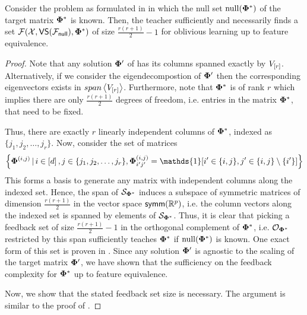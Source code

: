 \begin{lemma}\label{lem: orthoset}
    Consider the problem as formulated in  in which the null set $\mathrm{null}({\boldsymbol{\Phi}^*})$ of the target matrix $\boldsymbol{\Phi}^*$ is known. Then, the teacher sufficiently and necessarily finds a set ${\mathcal{F}}({\mathcal{X}},\textsf{VS}({\mathcal{F}}_{\textsf{null}}),\boldsymbol{\Phi}^*)$ of size $\frac{r(r+1)}{2} - 1$ for oblivious learning up to feature equivalence.
\end{lemma}
\begin{proof}

    Note that any solution $\boldsymbol{\Phi}'$ of  has its columns spanned exactly by $V_{\left[r\right]}$. Alternatively, if we consider the eigendecompostion of $\boldsymbol{\Phi}'$ then the corresponding eigenvectors exists in $span \left<V_{\left[r\right]}\right>$. Furthermore, note that $\boldsymbol{\Phi}^*$ is of rank $r$ which implies there are only $\frac{r(r+1)}{2}$ degrees of freedom, i.e. entries in the matrix $\boldsymbol{\Phi}^*$, that need to be fixed.

    Thus, there are exactly $r$ linearly independent columns of $\boldsymbol{\Phi}^*$, indexed as $\{j_1,j_2,\ldots, j_r\}$. Now, consider the set of matrices
    \begin{align*}
        \curlybracket{\pphi^{(i,j)}\,|\, i \in \bracket{d}, j \in \{j_1,j_2,\ldots, j_r\}, \pphi^{(i,j)}_{i'j'} = \mathds{1}[i'\in \{i,j\}, j' \in \{i,j\}\setminus \{i'\}]}
    \end{align*}
    This forms a basis to generate any matrix with independent columns along the indexed set. Hence, the span of $\mathcal{S}_{\boldsymbol{\Phi}^*}$ induces a subspace of symmetric matrices of dimension $\frac{r(r+1)}{2}$ in the vector space $\textsf{symm}(\mathbb{R}^p)$, i.e. the column vectors along the indexed set is spanned by elements of $\mathcal{S}_{\boldsymbol{\Phi}^*}$. Thus, it is clear that picking a feedback set of size $\frac{r(r+1)}{2} -1$ in the orthogonal complement of $\boldsymbol{\Phi}^*$, i.e. $\mathcal{O}_{\boldsymbol{\Phi}^*}$ restricted by this span sufficiently teaches $\boldsymbol{\Phi}^*$ if $\mathrm{null}({\boldsymbol{\Phi}^*})$ is known. One exact form of this set is proven in . Since any solution $\boldsymbol{\Phi}'$ is agnostic to the scaling of the target matrix $\boldsymbol{\Phi}'$, we have shown that the sufficiency on the feedback complexity for $\boldsymbol{\Phi}^*$ up to feature equivalence.

   Now, we show that the stated feedback set size is necessary. The argument is similar to the proof of .
   

\end{proof}

